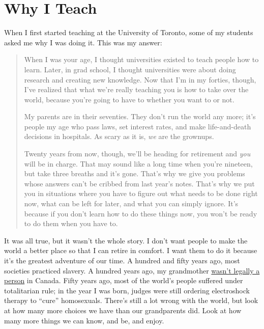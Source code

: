\chapter{Why I Teach}\label{s:finale}

When I first started teaching at the University of Toronto, some of my
students asked me why I was doing it. This was my answer:

\begin{quote}

When I was your age, I thought universities existed to teach people
how to learn. Later, in grad school, I thought universities were about
doing research and creating new knowledge. Now that I'm in my forties,
though, I've realized that what we're really teaching you is how to
take over the world, because you're going to have to whether you want
to or not.

My parents are in their seventies. They don't run the world any more;
it's people my age who pass laws, set interest rates, and make
life-and-death decisions in hospitals. As scary as it is, \emph{we} are the
grownups.

Twenty years from now, though, we'll be heading for retirement and
\emph{you} will be in charge. That may sound like a long time when you're
nineteen, but take three breaths and it's gone. That's why we give you
problems whose answers can't be cribbed from last year's notes. That's
why we put you in situations where you have to figure out what needs
to be done right now, what can be left for later, and what you can
simply ignore. It's because if you don't learn how to do these things
now, you won't be ready to do them when you have to.

\end{quote}

It was all true, but it wasn't the whole story. I don't want people to
make the world a better place so that I can retire in comfort. I want
them to do it because it's the greatest adventure of our time. A
hundred and fifty years ago, most societies practiced slavery. A
hundred years ago, my grandmother \href{https://en.wikipedia.org/wiki/The\_Famous\_Five\_(Canada)}{wasn't legally a
person} in Canada. Fifty years ago, most of the world's
people suffered under totalitarian rule; in the year I was born,
judges were still ordering electroshock therapy to ``cure''
homosexuals. There's still a lot wrong with the world, but look at how
many more choices we have than our grandparents did. Look at how many
more things we can know, and be, and enjoy.

